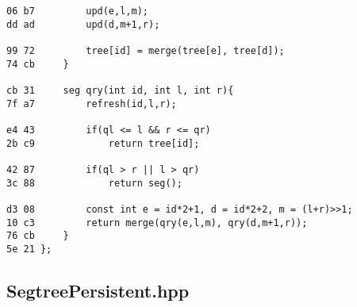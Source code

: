 \documentclass[11pt, a4paper, twoside]{article}
\begin{document}
\begin{lstlisting}
06 b7         upd(e,l,m);
dd ad         upd(d,m+1,r);
      
99 72         tree[id] = merge(tree[e], tree[d]);
74 cb     }
      
cb 31     seg qry(int id, int l, int r){
7f a7         refresh(id,l,r);
      
e4 43         if(ql <= l && r <= qr)
2b c9             return tree[id];
              
42 87         if(ql > r || l > qr)
3c 88             return seg();
              
d3 08         const int e = id*2+1, d = id*2+2, m = (l+r)>>1;
10 c3         return merge(qry(e,l,m), qry(d,m+1,r));
76 cb     }
5e 21 };
\end{lstlisting}

\subsection{SegtreePersistent.hpp}
\end{document}
